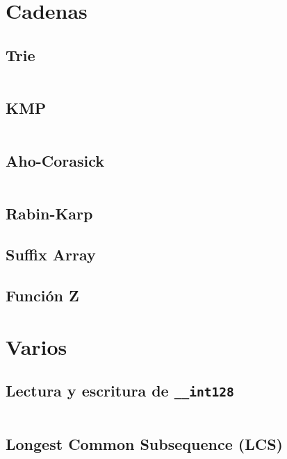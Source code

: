 \documentclass[11pt]{article}
\begin{document}
		
	\newpage
	\section{Cadenas}
		\subsection{Trie}
		\inputminted[tabsize=2,breaklines,firstline=144,lastline=196,fontsize=\small]{c++}{strings.cpp}
		
		\subsection{KMP}
		\inputminted[tabsize=2,breaklines,firstline=4,lastline=39,fontsize=\small]{c++}{strings.cpp}
		
		\subsection{Aho-Corasick}
		\inputminted[tabsize=2,breaklines,firstline=41,lastline=142,fontsize=\small]{c++}{strings.cpp}
		
		\subsection{Rabin-Karp}
		
		
		\subsection{Suffix Array}
		
		
		\subsection{Función Z}
		
	
	\newpage
	\section{Varios}
		\subsection{Lectura y escritura de \texttt{\_\_int128}}
		\inputminted[tabsize=2,breaklines,firstline=46,lastline=83,fontsize=\small]{c++}{misc.cpp}
		
		\subsection{Longest Common Subsequence (LCS)}
		\inputminted[tabsize=2,breaklines,firstline=21,lastline=33,fontsize=\small]{c++}{misc.cpp}
		
\end{document}
